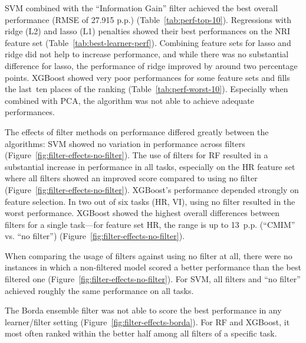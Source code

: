 \documentclass[remotesensing,article,accept,moreauthors,pdftex]{Definitions/mdpi}
\begin{document}
\begin{paracol}{2}
SVM combined with the \enquote{Information Gain} filter achieved the best overall performance (RMSE of 27.915 p.p.) (Table~\ref{tab:perf-top-10}).
Regressions with ridge (L2) and lasso (L1) penalties showed their best performances on the NRI feature set (Table~\ref{tab:best-learner-perf}).
Combining feature sets for lasso and ridge did not help to increase performance, and while there was no substantial difference for lasso, the performance of ridge improved by around two percentage points.
XGBoost showed very poor performances for some feature sets and fills the last\ ten places of the ranking (Table~\ref{tab:perf-worst-10}).
Especially when combined with PCA, the algorithm was not able to achieve adequate performances.

The effects of filter methods on performance differed greatly between the algorithms:
SVM showed no variation in performance across filters (Figure~\ref{fig:filter-effects-no-filter}).
The use of filters for RF resulted in a substantial increase in performance in all tasks, especially on the HR feature set where all filters showed an improved score compared to using no filter (Figure~\ref{fig:filter-effects-no-filter}).
XGBoost's performance depended strongly on feature selection. In two out of six tasks (HR, VI), using no filter resulted in the worst performance.
XGBoost showed the highest overall differences between filters for a single task---for feature set HR, the range is up to 13~p.p. (\enquote{CMIM} vs. \enquote{no filter}) (Figure~\ref{fig:filter-effects-no-filter}).

When comparing the usage of filters against using no filter at all, there were no instances in which a non-filtered model scored a better performance than the best filtered one (Figure~\ref{fig:filter-effects-no-filter}).
For SVM, all filters and \enquote{no filter} achieved roughly the same performance on all tasks.

The Borda ensemble filter was not able to score the best performance in any learner/\linebreak filter setting (Figure~\ref{fig:filter-effects-borda}).
For RF and XGBoost, it most often ranked within the better half among all filters of a specific task.


\end{paracol}
\end{document}
